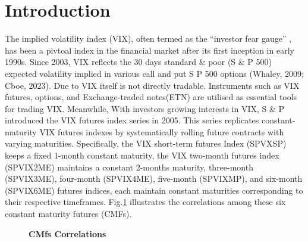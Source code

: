 \documentclass[10pt,letterpaper]{article}
\begin{document}
\section*{Introduction}
The implied volatility index (VIX), often termed as the “investor fear gauge” , has been a pivtoal index in the financial market after its first inception in early 1990s. Since 2003, VIX reflects the 30 days standard \& poor (S \& P 500) expected volatility implied in various call and put S P 500 options (Whaley, 2009; Cboe, 2023). Due to VIX itself is not directly tradable. Instruments such as VIX futures, options, and Exchange-traded notes(ETN) are utilised as essential tools for trading VIX. Meanwhile, With investors growing interests in VIX, S \& P introduced the VIX futures index series in 2005. This series replicates constant-maturity VIX futures indexes by systematically rolling future contracts with varying maturities. Specifically, the VIX short-term futures Index (SPVXSP) keeps a fixed 1-month constant maturity, the VIX two-month futures index (SPVIX2ME) maintains a constant 2-months maturity, three-month (SPVIX3ME), four-month (SPVIX4ME), five-month (SPVIXMP), and six-month (SPVIX6ME) futures indices, each maintain constant maturities corresponding to their respective timeframes. Fig.\ref{fig1} illustrates the correlations among these six constant maturity futures (CMFs).


\begin{figure}[!h]
\caption{\bf CMfs Correlations}
\label{fig1}
\end{figure}
\end{document}
